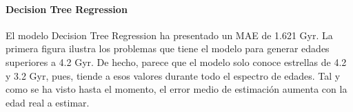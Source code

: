 \paragraph{Decision Tree Regression} 
El modelo Decision Tree Regression ha presentado un MAE de 1.621 Gyr. La primera figura ilustra los problemas que tiene el modelo para generar edades superiores a 4.2 Gyr. De hecho, parece que el modelo solo conoce estrellas de 4.2 y 3.2 Gyr, pues, tiende a esos valores durante todo el espectro de edades. Tal y como se ha visto hasta el momento, el error medio de estimación aumenta con la edad real a estimar. %

\begin{figure}[h]
\begin{minipage}{.33\linewidth}
\centering
{}
\end{minipage}%
\begin{minipage}{.33\linewidth}
\centering
{}

\end{minipage}
\end{figure}
